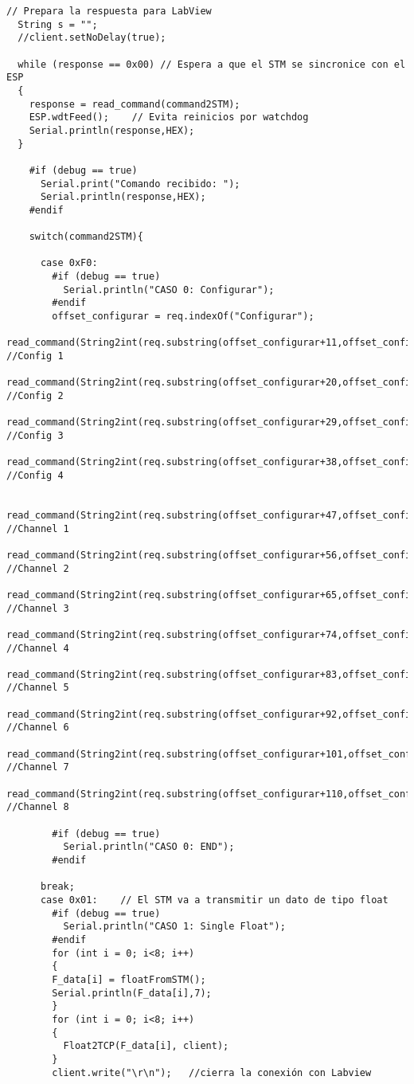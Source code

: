 \begin{lstlisting}[label=algoritmo:ESP:master_fast.ino,style = STM-code,frame=single,caption=ESP:master\_fast.ino]
  // Prepara la respuesta para LabView
  String s = "";
  //client.setNoDelay(true);

  while (response == 0x00) // Espera a que el STM se sincronice con el ESP
  {
    response = read_command(command2STM);
    ESP.wdtFeed();    // Evita reinicios por watchdog
    Serial.println(response,HEX);
  }
   
    #if (debug == true)
      Serial.print("Comando recibido: ");
      Serial.println(response,HEX);
    #endif
    
    switch(command2STM){
      
      case 0xF0:
        #if (debug == true)
          Serial.println("CASO 0: Configurar");
        #endif
        offset_configurar = req.indexOf("Configurar");
        read_command(String2int(req.substring(offset_configurar+11,offset_configurar+19))); //Config 1
        read_command(String2int(req.substring(offset_configurar+20,offset_configurar+28))); //Config 2
        read_command(String2int(req.substring(offset_configurar+29,offset_configurar+37))); //Config 3
        read_command(String2int(req.substring(offset_configurar+38,offset_configurar+46))); //Config 4

        read_command(String2int(req.substring(offset_configurar+47,offset_configurar+55))); //Channel 1
        read_command(String2int(req.substring(offset_configurar+56,offset_configurar+64))); //Channel 2
        read_command(String2int(req.substring(offset_configurar+65,offset_configurar+73))); //Channel 3
        read_command(String2int(req.substring(offset_configurar+74,offset_configurar+82))); //Channel 4
        read_command(String2int(req.substring(offset_configurar+83,offset_configurar+91))); //Channel 5
        read_command(String2int(req.substring(offset_configurar+92,offset_configurar+100))); //Channel 6
        read_command(String2int(req.substring(offset_configurar+101,offset_configurar+109))); //Channel 7
        read_command(String2int(req.substring(offset_configurar+110,offset_configurar+118))); //Channel 8
        
        #if (debug == true)
          Serial.println("CASO 0: END");
        #endif
        
      break;
      case 0x01:    // El STM va a transmitir un dato de tipo float
        #if (debug == true)
          Serial.println("CASO 1: Single Float");
        #endif
        for (int i = 0; i<8; i++)
        {
        F_data[i] = floatFromSTM();
        Serial.println(F_data[i],7);
        }
        for (int i = 0; i<8; i++)
        {
          Float2TCP(F_data[i], client);
        }
        client.write("\r\n");   //cierra la conexión con Labview
        

\end{lstlisting}
